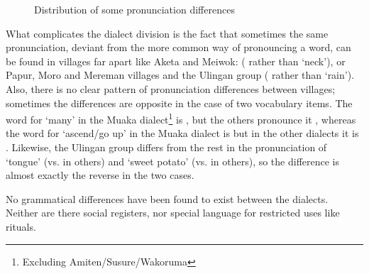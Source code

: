  
\begin{figure}
\caption{Distribution of some pronunciation differences}
\label{map:1:prondistribution}

\end{figure}

What complicates the dialect division is the fact that sometimes the same pronunciation, deviant from the more common way of pronouncing a word, can be found in villages far apart like Aketa and Meiwok: ( rather than  `neck'), or Papur,  Moro and Mereman villages and the Ulingan group ( rather than  `rain'). Also, there is no clear pattern of pronunciation differences between villages; sometimes the differences are opposite in the case of two vocabulary items. The word for `many' in the Muaka dialect\footnote{Excluding Amiten/Susure/Wakoruma} is , but the others pronounce it , whereas the word for `ascend/go up' in the Muaka dialect is \emphs but in the other dialects it is . Likewise, the Ulingan group differs from the rest in the pronunciation of  `tongue' (vs.  in others) and  `sweet potato' (vs.  in others), so the difference is almost exactly the reverse in the two cases.  

No grammatical differences have been found to exist between the dialects.  Neither are there social registers, nor special language for restricted uses like rituals. 

